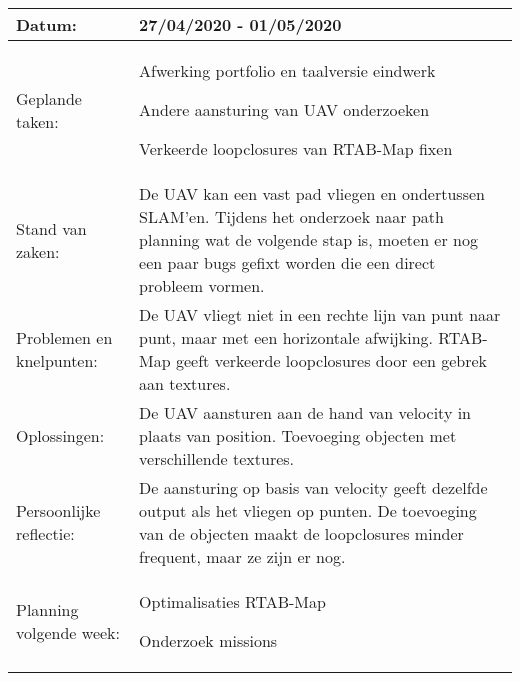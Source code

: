 \begin{tabularx}{\textwidth}{| l | X |}
  \hline
  Datum: & 27/04/2020 - 01/05/2020\\
  \hline
  Geplande taken: &
  \begin{compactitem}
    \item Afwerking portfolio en taalversie eindwerk
    \item Andere aansturing van UAV onderzoeken
    \item Verkeerde loopclosures van RTAB-Map fixen
  \end{compactitem}\\
  \hline
  Stand van zaken: & De UAV kan een vast pad vliegen en ondertussen SLAM'en. Tijdens het onderzoek naar path planning wat de volgende stap is, moeten er nog een paar bugs gefixt worden die een direct probleem vormen.\\
  \hline
  Problemen en knelpunten: & De UAV vliegt niet in een rechte lijn van punt naar punt, maar met een horizontale afwijking. RTAB-Map geeft verkeerde loopclosures door een gebrek aan textures.\\
  \hline
  Oplossingen: & De UAV aansturen aan de hand van velocity in plaats van position. Toevoeging objecten met verschillende textures.\\
  \hline
  Persoonlijke reflectie: & De aansturing op basis van velocity geeft dezelfde output als het vliegen op punten. De toevoeging van de objecten maakt de loopclosures minder frequent, maar ze zijn er nog.\\
  \hline
  Planning volgende week: &
  \begin{compactitem}
    \item Optimalisaties RTAB-Map
    \item Onderzoek missions
  \end{compactitem}\\
  \hline
\end{tabularx}